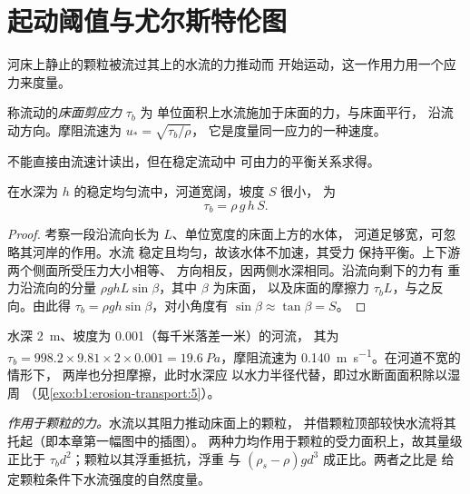 \section{起动阈值与尤尔斯特伦图}\label{sec:b1:erosion-transport:threshold}

河床上静止的颗粒被流过其上的水流的力推动而
开始运动，这一作用力用一个应力来度量。

\begin{definition}\label{def:b1:erosion-transport:bed-shear}
称流动的\emph{床面剪应力} $\tau_b$ 为
单位面积上水流施加于床面的力，与床面平行，
沿流动方向。摩阻流速为 $u_* = \sqrt{\tau_b/\rho}$，
它是度量同一应力的一种速度。
\end{definition}

不能直接由流速计读出，但在稳定流动中
可由力的平衡关系求得。

\begin{proposition}[水深–坡度乘积]\label{prop:b1:erosion-transport:depth-slope}
在水深为 $h$ 的稳定均匀流中，河道宽阔，坡度 $S$ 很小，
为
\[
  \tau_b = \rho\,g\,h\,S .
\]
\end{proposition}

\begin{proof}
考察一段沿流向长为 $L$、单位宽度的床面上方的水体，
河道足够宽，可忽略其河岸的作用。水流
稳定且均匀，故该水体不加速，其受力
保持平衡。上下游两个侧面所受压力大小相等、
方向相反，因两侧水深相同。沿流向剩下的力有
重力沿流向的分量 $\rho g h L \sin\beta$，其中 $\beta$ 为床面，
以及床面的摩擦力 $\tau_b L$，与之反向。由此得 $\tau_b
= \rho g h \sin\beta$，对小角度有 $\sin\beta \approx \tan\beta = S$。
\end{proof}

水深 \qty{2}{m}、坡度为 \num{0.001}（每千米落差一米）的河流，
其为 $\tau_b = 998.2 \times 9.81 \times 2 \times 0.001 =
\qty{19.6}{Pa}$，摩阻流速为 \qty{0.140}{m.s^{-1}}。在河道不宽的情形下，
两岸也分担摩擦，此时水深应
以水力半径代替，即过水断面面积除以湿周
（见\cref{exo:b1:erosion-transport:5}）。

\emph{作用于颗粒的力。}水流以其阻力推动床面上的颗粒，
并借颗粒顶部较快水流将其托起（即本章第一幅图中的插图）。
两种力均作用于颗粒的受力面积上，故其量级正比于 $\tau_b
d^2$；颗粒以其浮重抵抗，浮重
与 $(\rho_s - \rho) g d^3$ 成正比。两者之比是
给定颗粒条件下水流强度的自然度量。


